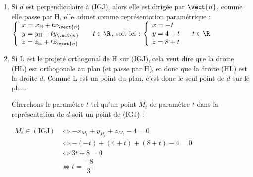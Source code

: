 \begin{enumerate}
\begin{enumerate}
Ainsi, $\vect{n}$ est orthogonal à deux vecteurs non colinéaires du plan (IGJ) : c'est donc un vecteur normal au plan.

	\item Une équation cartésienne d'un plan dont $ \vect{n} $ est un vecteur normal est de la forme : \linebreak$-1\times x + 1 \times y + 1\times z + d =0$, soit $-x+y+z+d=0$, où $d$ est un réel quelconque.

Comme G est un point du plan (IGJ), on en déduit que la constante $d$ dans ce cas doit être telle que :

$\begin{aligned} -x_\mathrm{G} +y_\mathrm{G}+z_\mathrm{G} +d=0 &\iff -4+4+4+d = 0\\&\iff d = -4\\ \end{aligned}$

Une équation de (IGJ) est donc : $-x + y + z - 4 = 0$.
	\end{enumerate}
\item Si $d$ est perpendiculaire à (IGJ), alors elle est dirigée par $\vect{n}$, comme elle passe par H, elle admet comme représentation paramétrique : $ \left\{\begin{array}{l} x=x_\mathrm{H} + tx_{\vect{n}}\\y=y_\mathrm{H} + ty_{\vect{n}}\\z=z_\mathrm{H} + tz_{\vect{n}} \end{array}\right. \quad t \in \R $, soit ici : $ \left\{\begin{array}{l} x=-t\\y=4 + t\\z=8+t \end{array}\right. \quad t \in \R $

\item Si L est le projeté orthogonal de H sur (IGJ), cela veut dire que la droite (HL) est orthogonale au plan (et passe par H), et donc que la droite (HL) est la droite $d$. Comme L est un point du plan, c'est donc le seul point de $d$ sur le plan.

Cherchons le paramètre $t$ tel qu'un point $M_t$ de paramètre $t$ dans la représentation de $d$ soit un point de (IGJ) :

$\begin{aligned} M_t \in (\mathrm{IGJ}) &\iff -x_{M_t} + y_{M_t}+z_{M_t} - 4 = 0\\
&\iff -(-t) + (4+t) + (8 + t) - 4 = 0\\
&\iff 3t +8 = 0\\
&\iff t = \dfrac{-8}{3}\\ \end{aligned}$


\end{enumerate}
